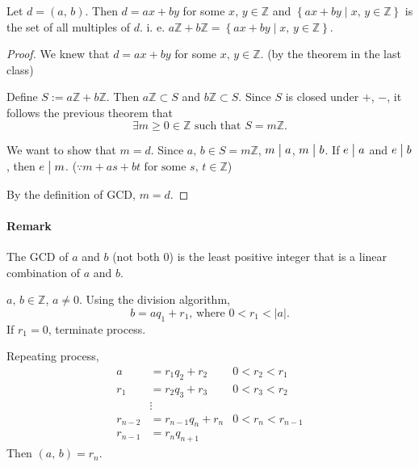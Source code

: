 \begin{theorem}
    Let $d=\left(a,\,b\right)$. Then $d=ax+by$ for some $x,\,y \in \mathbb{Z}$
    and $\left\{ax+by \mid x,\,y \in \mathbb{Z}\right\}$ is the set of all multiples of $d$.
    i. e. $a\mathbb{Z}+b\mathbb{Z} = \left\{ax+by \mid x,\,y \in \mathbb{Z}\right\}$.
\end{theorem}

\begin{proof}
    We knew that $d=ax+by$ for some $x,\,y \in \mathbb{Z}$. (by the theorem in the last class)

    Define $S := a\mathbb{Z} + b\mathbb{Z}$. Then $a\mathbb{Z} \subset S$ and $b\mathbb{Z} \subset S$.
    Since $S$ is closed under $+$, $-$, it follows the previous theorem that
    \[\exists m \geq 0 \in \mathbb{Z} \mbox{ such that } S = m\mathbb{Z}.\]

    We want to show that $m=d$. Since $a,\,b \in S = m\mathbb{Z}$, $m \bigm| a$, $m \bigm| b$.
    If $e \bigm| a$ and $e \bigm| b$, then $e \bigm| m$.
    ($\because m + as + bt \mbox{ for some } s,\,t \in \mathbb{Z}$)
    
    By the definition of GCD, $m=d$.
\end{proof}

\paragraph{Remark}
The GCD of $a$ and $b$ (not both 0)
is the least positive integer that is a linear combination of $a$ and $b$.

\begin{theorem}
    $a,\,b \in \mathbb{Z}$, $a \neq 0$.
    Using the division algorithm, \[b = aq_1 + r_1\mbox{, where }0<r_1<\left|a\right|.\]
    If $r_1 = 0$, terminate process.

    Repeating process,
    \begin{align*}
        a &= r_1q_2 + r_2 & 0<r_2<r_1 \\
        r_1 &= r_2q_3 + r_3 & 0<r_3<r_2 \\
        &\vdots \\
        r_{n-2} &= r_{n-1}q_n + r_n & 0<r_n<r_{n-1} \\
        r_{n-1} &= r_nq_{n+1}
    \end{align*}
    Then $\left(a,\,b\right)=r_n$.
\end{theorem}

